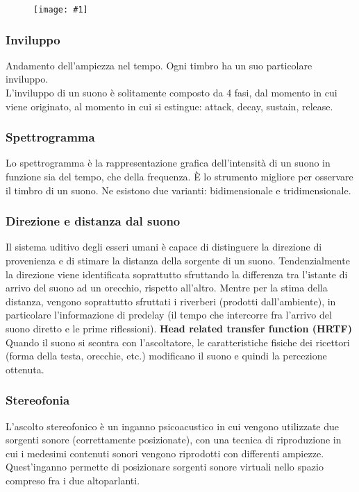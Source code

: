 \documentclass[8pt,a4paper]{article}
\newcommand{\f}[1]{
      \begin{figure}[H]
        \center
      \texttt{[image: \#1]}
      \end{figure}
}
\begin{document}
\begin{multicols}{5}
    \f{noise-types}

    \subsubsection{Inviluppo}
    Andamento dell'ampiezza nel tempo. Ogni timbro ha un suo particolare inviluppo. \\
    L’inviluppo di un suono è solitamente composto da 4 fasi, dal momento in cui viene 
    originato, al momento in cui si estingue: attack, decay, sustain, release.

    \subsubsection{Spettrogramma}
    Lo spettrogramma è la rappresentazione grafica dell'intensità di un suono in funzione
    sia del tempo, che della frequenza. È lo strumento migliore per osservare il timbro
    di un suono. Ne esistono due varianti: bidimensionale e tridimensionale.
 
    \subsubsection{Direzione e distanza dal suono}
    Il sistema uditivo degli esseri umani è capace di distinguere la direzione di 
    provenienza e di stimare la distanza della sorgente di un suono. Tendenzialmente 
    la direzione viene identificata soprattutto sfruttando la differenza tra l’istante 
    di arrivo del suono ad un orecchio, rispetto all’altro. Mentre per la stima della 
    distanza, vengono soprattutto sfruttati i riverberi (prodotti dall’ambiente), in
    particolare l’informazione di predelay (il tempo che intercorre fra l’arrivo del
    suono diretto e le prime riflessioni).
    \textbf{Head related transfer function (HRTF)}
    Quando il suono si scontra con l’ascoltatore, le caratteristiche fisiche dei 
    ricettori (forma della testa, orecchie, etc.) modificano il suono e quindi la 
    percezione ottenuta.
 
    \subsubsection{Stereofonia}
    L’ascolto stereofonico è un inganno psicoacustico in cui vengono utilizzate due
    sorgenti sonore (correttamente posizionate), con una tecnica di riproduzione in
    cui i medesimi contenuti sonori vengono riprodotti con differenti ampiezze.
    Quest’inganno permette di posizionare sorgenti sonore virtuali nello spazio
    compreso fra i due altoparlanti.



\end{multicols}
\end{document}

